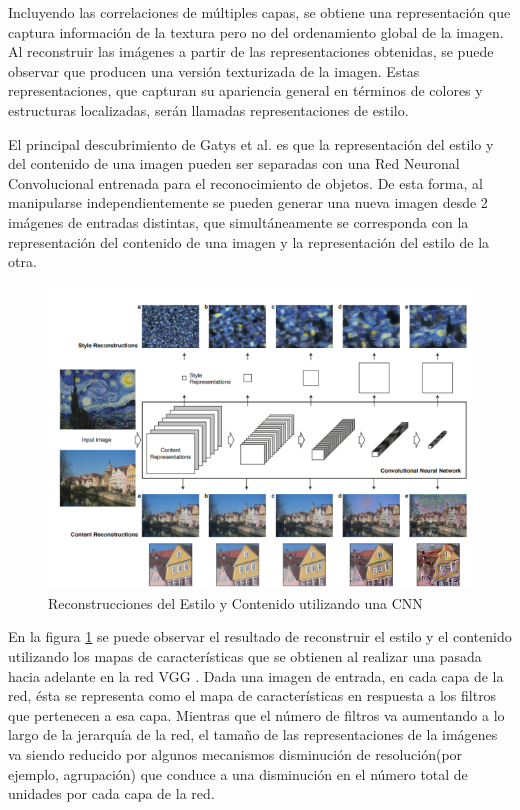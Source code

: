 \documentclass[a4paper,11pt,spanish]{book}
\begin{document}
      Incluyendo las correlaciones de múltiples capas, se obtiene una representación que captura información de la textura pero no del ordenamiento global de la imagen.
      Al reconstruir las imágenes a partir de las representaciones obtenidas, se puede observar que producen una versión texturizada de la imagen.
      Estas representaciones, que capturan su apariencia general en términos de colores y estructuras localizadas, serán llamadas representaciones de estilo.
      
      El principal descubrimiento de Gatys et al. es que la representación del estilo y del contenido de una imagen pueden ser separadas con una Red Neuronal Convolucional entrenada
      para el reconocimiento de objetos. De esta forma, al manipularse independientemente se pueden generar una nueva imagen desde 2 imágenes de entradas distintas, que 
      simultáneamente se corresponda con la representación del contenido de una imagen y la representación del estilo de la otra.
      
      \begin{figure}[h]
	\includegraphics[width=\textwidth]{./img/gatys_1.png}
	\caption{Reconstrucciones del Estilo y Contenido utilizando una CNN}
	\label{fig:gatys_reconstrucciones}
      \end{figure}
	  
      En la figura \ref{fig:gatys_reconstrucciones} se puede observar el resultado de reconstruir el estilo y el contenido utilizando los mapas de características que se obtienen al
      realizar una pasada hacia adelante en la red VGG \cite{SimonyanVGG}. Dada una imagen de entrada, en cada capa de la red, ésta se representa como el mapa de características en respuesta a los filtros
      que pertenecen a esa capa. Mientras que el número de filtros va aumentando a lo largo de la jerarquía de la red, el tamaño de las representaciones de la imágenes va siendo reducido 
      por algunos mecanismos disminución de resolución(por ejemplo, agrupación) que conduce a una disminución en el número total de unidades por cada capa de la red.
      
\end{document}
